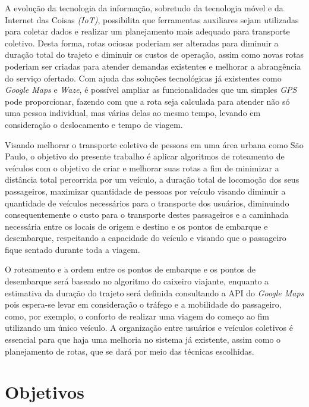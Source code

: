 A evolução da tecnologia da informação, sobretudo da tecnologia móvel e da Internet das Coisas \emph{(IoT)}, possibilita que ferramentas auxiliares sejam utilizadas para coletar dados e realizar um planejamento mais adequado para transporte coletivo. Desta forma, rotas ociosas poderiam ser alteradas para diminuir a duração total do trajeto e diminuir os custos de operação, assim como novas rotas poderiam ser criadas para atender demandas existentes e melhorar a abrangência do serviço ofertado. Com ajuda das soluções tecnológicas já existentes como \emph{Google Maps} e \emph{Waze}, é possível ampliar as funcionalidades que um simples \emph{GPS} pode proporcionar, fazendo com que a rota seja calculada para atender não só uma pessoa individual, mas várias delas ao mesmo tempo, levando em consideração o deslocamento e tempo de viagem.


Visando melhorar o transporte coletivo de pessoas em uma área urbana como São Paulo, o objetivo do presente trabalho é aplicar algoritmos de roteamento de veículos com o objetivo de criar e melhorar suas rotas a fim de minimizar a distância total percorrida por um veículo, a duração total de locomoção dos seus passageiros, maximizar quantidade de pessoas por veículo visando diminuir a quantidade de veículos necessários para o transporte dos usuários, diminuindo consequentemente o custo para o transporte destes passageiros e a caminhada necessária entre os locais de origem e destino e os pontos de embarque e desembarque, respeitando a capacidade do veículo e visando que o passageiro fique sentado durante toda a viagem.


O roteamento e a ordem entre os pontos de embarque e os pontos de desembarque será baseado no algoritmo do caixeiro viajante, enquanto a estimativa da duração do trajeto será definida consultando a API do \emph{Google Maps} pois espera-se levar em consideração o tráfego e a mobilidade do passageiro, como, por exemplo, o conforto de realizar uma viagem do começo ao fim utilizando um único veículo. A organização entre usuários e veículos coletivos é essencial para que haja uma melhoria no sistema já existente, assim como o planejamento de rotas, que se dará por meio das técnicas escolhidas.


\section{Objetivos}

